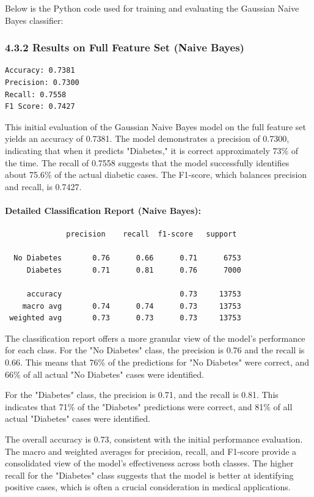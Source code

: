 Below is the Python code used for training and evaluating the Gaussian Naive Bayes classifier:



\subsubsection*{4.3.2 Results on Full Feature Set (Naive Bayes)}

\begin{verbatim}
Accuracy: 0.7381
Precision: 0.7300
Recall: 0.7558
F1 Score: 0.7427
\end{verbatim}
This initial evaluation of the Gaussian Naive Bayes model on the full feature set yields an accuracy of 0.7381. The model demonstrates a precision of 0.7300, indicating that when it predicts "Diabetes," it is correct approximately 73\% of the time. The recall of 0.7558 suggests that the model successfully identifies about 75.6\% of the actual diabetic cases. The F1-score, which balances precision and recall, is 0.7427.

\paragraph*{Detailed Classification Report (Naive Bayes):}
\begin{verbatim}
              precision    recall  f1-score   support

  No Diabetes       0.76      0.66      0.71      6753
     Diabetes       0.71      0.81      0.76      7000

     accuracy                           0.73     13753
    macro avg       0.74      0.74      0.73     13753
 weighted avg       0.73      0.73      0.73     13753
\end{verbatim}
The classification report offers a more granular view of the model's performance for each class. For the "No Diabetes" class, the precision is 0.76 and the recall is 0.66. This means that 76\% of the predictions for "No Diabetes" were correct, and 66\% of all actual "No Diabetes" cases were identified.

For the "Diabetes" class, the precision is 0.71, and the recall is 0.81. This indicates that 71\% of the "Diabetes" predictions were correct, and 81\% of all actual "Diabetes" cases were identified.

The overall accuracy is 0.73, consistent with the initial performance evaluation. The macro and weighted averages for precision, recall, and F1-score provide a consolidated view of the model's effectiveness across both classes. The higher recall for the "Diabetes" class suggests that the model is better at identifying positive cases, which is often a crucial consideration in medical applications.